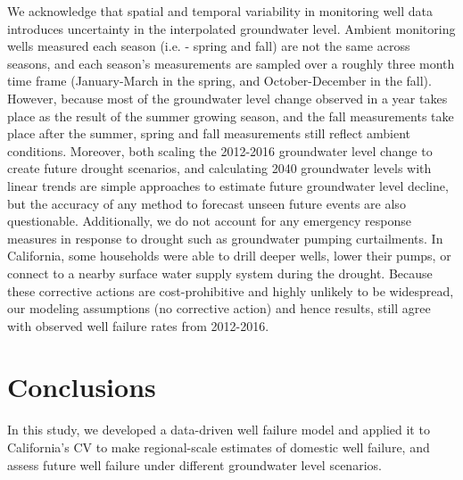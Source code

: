We acknowledge that spatial and temporal variability in monitoring well data introduces uncertainty in the interpolated groundwater level. Ambient monitoring wells measured each season (i.e. - spring and fall) are not the same across seasons, and each season's measurements are sampled over a roughly three month time frame (January-March in the spring, and October-December in the fall). However, because most of the groundwater level change observed in a year takes place as the result of the summer growing season, and the fall measurements take place after the summer, spring and fall measurements still reflect ambient conditions. Moreover, both scaling the 2012-2016 groundwater level change to create future drought scenarios, and calculating 2040 groundwater levels with linear trends are simple approaches to estimate future groundwater level decline, but the accuracy of any method to forecast unseen future events are also questionable. Additionally, we do not account for any emergency response measures in response to drought such as groundwater pumping curtailments. In California, some households were able to drill deeper wells, lower their pumps, or connect to a nearby surface water supply system during the drought. Because these corrective actions are cost-prohibitive and highly unlikely to be widespread, our modeling assumptions (no corrective action) and hence results, still agree with observed well failure rates from 2012-2016. 




\section{Conclusions}


In this study, we developed a data-driven well failure model and applied it to California's CV to make regional-scale estimates of domestic well failure, and assess future well failure under different groundwater level scenarios.  

